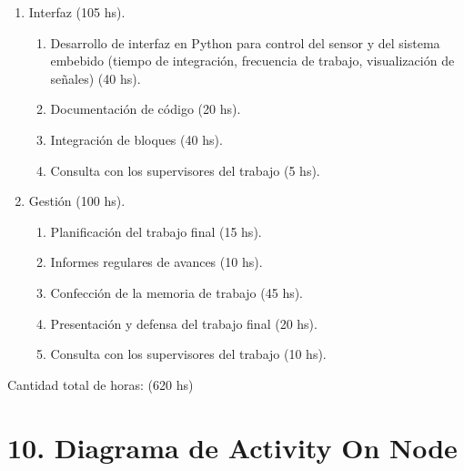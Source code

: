\documentclass[
11pt, %
codirector, %
]{charter}
\begin{document}
\begin{enumerate}
\item Interfaz (105 hs).
	\begin{enumerate}
	\item Desarrollo de interfaz en Python para control del sensor y del sistema embebido (tiempo de integración, frecuencia de trabajo, visualización de señales) (40 hs).
	\item Documentación de código (20 hs).
	\item Integración de bloques (40 hs).
	\item Consulta con los supervisores del trabajo (5 hs).	
	\end{enumerate}		

\item Gestión (100 hs).
	\begin{enumerate}
	\item Planificación del trabajo final (15 hs).
	\item Informes regulares de avances (10 hs).
	\item Confección de la memoria de trabajo (45 hs).
	\item Presentación y defensa del trabajo final (20 hs).
	\item Consulta con los supervisores del trabajo (10 hs).
	\end{enumerate}		
\end{enumerate}

Cantidad total de horas: (620 hs)


\section{10. Diagrama de Activity On Node}
\label{sec:AoN}
\end{document}
